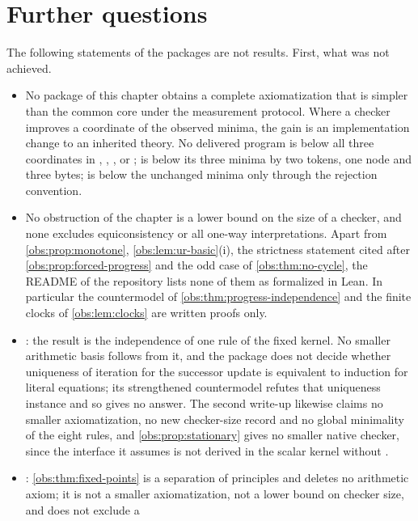 \section{Further questions}
\label{obs:sec:questions}

The following statements of the packages are not results. First, what was not
achieved.

\begin{itemize}
\item No package of this chapter obtains a complete axiomatization that is
simpler than the common core under the measurement protocol. Where a checker
improves a coordinate of the observed minima, the gain is an implementation
change to an inherited theory. No delivered program is below all three
coordinates in , ,
,  or
;  is below its three
minima by two tokens, one node and three bytes;  is
below the unchanged minima only through the rejection convention.
\item No obstruction of the chapter is a lower bound on the size of a checker,
and none excludes equiconsistency or all one-way interpretations. Apart from
\cref{obs:prop:monotone}, \cref{obs:lem:ur-basic}(i), the strictness
statement cited after \cref{obs:prop:forced-progress} and the odd case of
\cref{obs:thm:no-cycle}, the README of the repository lists none of them as
formalized in Lean. In particular the countermodel of
\cref{obs:thm:progress-independence} and the finite clocks of
\cref{obs:lem:clocks} are written proofs only.
\item {}: the result is the independence of one rule
of the fixed kernel. No smaller arithmetic basis follows from it, and the
package does not decide whether uniqueness of iteration for the successor
update is equivalent to induction for literal equations; its strengthened
countermodel refutes that uniqueness instance and so gives no answer. The second
write-up likewise claims no smaller axiomatization, no new checker-size record
and no global minimality of the eight rules, and \cref{obs:prop:stationary}
gives no smaller native checker, since the interface it assumes is not derived
in the scalar kernel without .
\item {}: \cref{obs:thm:fixed-points} is a
separation of principles and deletes no arithmetic axiom; it is not a smaller
axiomatization, not a lower bound on checker size, and does not exclude a

\end{itemize}
